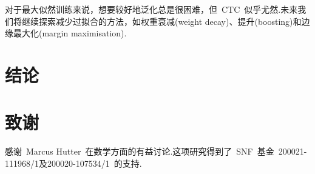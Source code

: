 \documentclass{ctexart}
\begin{document}
对于最大似然训练来说，想要较好地泛化总是很困难，但~CTC~似乎尤然.未来我们将继续探索减少过拟合的方法，如权重衰减(weight decay)、提升(boosting)和边缘最大化(margin maximisation).
\section{结论}
\label{sec:conclusion}

\section*{致谢}
感谢~Marcus Hutter~在数学方面的有益讨论.这项研究得到了~SNF~基金~200021-111968/1及200020-107534/1~的支持.



\end{document}
